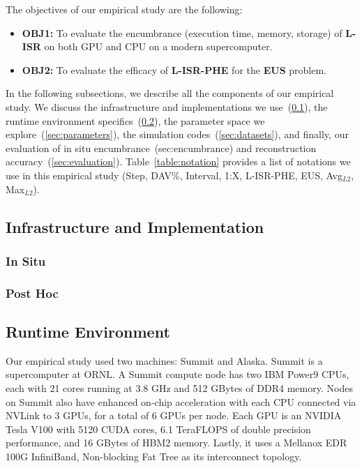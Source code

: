 The objectives of our empirical study are the following:
\begin{itemize}
\item \textbf{OBJ1:} To evaluate the encumbrance (execution time, memory, storage) of \textbf{L-ISR} on both GPU and CPU on a modern supercomputer.
\item \textbf{OBJ2:} To evaluate the efficacy of \textbf{L-ISR-PHE} for the \textbf{EUS} problem.
\end{itemize}
%

In the following subsections, we describe all the components of our empirical study.
%
We discuss the infrastructure and implementations we use~(\ref{sec:infra}), the runtime environment specifics~(\ref{sec:runtime}), the parameter space we explore~(\ref{sec:parameters}), the simulation codes~(\ref{sec:datasets}), and finally, our evaluation of in situ encumbrance~(sec:encumbrance) and reconstruction accuracy~(\ref{sec:evaluation}).
%
Table~\ref{table:notation} provides a list of notations we use in this empirical study (Step, DAV\%, Interval, 1:X, L-ISR-PHE, EUS, Avg$_{L2}$, Max$_{L2}$).


\subsection{Infrastructure and Implementation}
\label{sec:infra}
\subsubsection{In Situ}
\label{sec:insituimp}

\subsubsection{Post Hoc}


\subsection{Runtime Environment}
\label{sec:runtime}
Our empirical study used two machines: Summit and Alaska. 
%
Summit is a supercomputer at ORNL. 
%
A Summit compute node has two IBM Power9 CPUs, each with 21 cores running at 3.8 GHz and 512 GBytes of DDR4 memory. 
%
Nodes on Summit also have enhanced on-chip acceleration with each CPU connected via NVLink to 3 GPUs, for a total of 6 GPUs per node. 
%
Each GPU is an NVIDIA Tesla V100 with 5120 CUDA cores, 6.1 TeraFLOPS of double precision performance, and 16 GBytes of HBM2 memory.
%
Lastly, it uses a Mellanox EDR 100G InfiniBand, Non-blocking Fat Tree as its interconnect topology.

